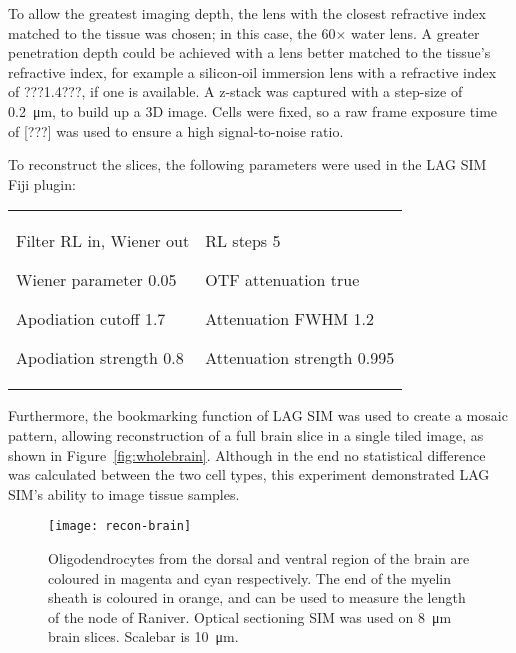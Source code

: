 To allow the greatest imaging depth, the lens with the closest refractive index matched to the tissue was chosen; in this case, the 60$\times$ water lens. 
A greater penetration depth could be achieved with a lens better matched to the tissue's refractive index, for example a silicon-oil immersion lens with a refractive index of ???1.4???, if one is available. 
A z-stack was captured with a step-size of \SI{0.2}{\micro\metre}, to build up a 3D image. 
Cells were fixed, so a raw frame exposure time of [???] was used to ensure a high signal-to-noise ratio. 

To reconstruct the slices, the following parameters were used in the LAG SIM Fiji plugin:\newline
\begin{tabular}{p{}p{}}
\begin{labelling}[margin={Attenuation strength}]
	\item[Filter] RL in, Wiener out
	\item[Wiener parameter] 0.05
	\item[Apodiation cutoff] 1.7
	\item[Apodiation strength] 0.8
\end{labelling} &
\begin{labelling}[margin={Attenuation strength}]
	\item[RL steps] 5
	\item[OTF attenuation] true
	\item[Attenuation FWHM] 1.2
	\item[Attenuation strength] 0.995 
\end{labelling} %
\end{tabular}

Furthermore, the bookmarking function of LAG SIM was used to create a mosaic pattern, allowing reconstruction of a full brain slice in a single tiled image, as shown in Figure~\ref{fig:wholebrain}. 
Although in the end no statistical difference was calculated between the two cell types, this experiment demonstrated LAG SIM's ability to image tissue samples. 

\begin{figure}[tbp!]
\centering
\texttt{[image: recon-brain]}
\caption[LAG SIM: Multi-colour optical sectioning SIM to measure the node of Raniver]{Oligodendrocytes from the dorsal and ventral region of the brain are coloured in magenta and cyan respectively. The end of the myelin sheath is coloured in orange, and can be used to measure the length of the node of Raniver. Optical sectioning SIM was used on \SI{8}{\micro\metre} brain slices. Scalebar is \SI{10}{\micro\metre}. }
\label{fig:recon-brain}
\end{figure}

